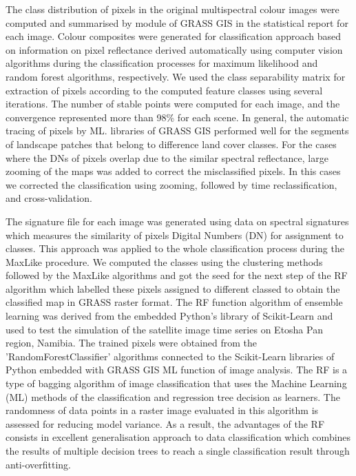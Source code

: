 \documentclass[climate,article,submit,pdftex,moreauthors]{Definitions/mdpi}
\begin{document}
The class distribution of pixels in the original multispectral colour images were computed and summarised by module of GRASS GIS in the statistical report for each image. Colour composites were generated for classification approach based on information on pixel reflectance derived automatically using computer vision algorithms during the classification processes for maximum likelihood and random forest algorithms, respectively. We used the class separability matrix for extraction of pixels according to the computed feature classes using several iterations. The number of stable points were computed for each image, and the convergence represented more than 98\% for each scene. {In general, the automatic tracing of pixels by ML. libraries of GRASS GIS performed well for the segments of landscape patches that belong to difference land cover classes. For the cases where the DNs of pixels overlap due to the similar spectral reflectance, large zooming of the maps was added to correct the misclassified pixels. In this cases we corrected the classification using zooming, followed by time reclassification, and cross-validation.
}

{The signature} file for each image was generated using data on spectral signatures which measures the similarity  of pixels Digital Numbers (DN) for assignment to classes. This approach was applied to the whole classification process during the MaxLike procedure. We computed the classes using the clustering methods followed by the MaxLike algorithms and got the seed for the next step of {the RF} algorithm which labelled these pixels assigned to different classed to obtain the classified map in GRASS raster format. {The RF} function algorithm of ensemble learning was derived from the embedded Python's library of Scikit-Learn and used to test the simulation of the satellite image time series on Etosha Pan region, Namibia. The trained pixels were obtained from the 'RandomForestClassifier' algorithms connected to the Scikit-Learn libraries of Python \cite{Pedregosa} embedded with GRASS GIS ML function of image analysis. The RF is a type of bagging algorithm of image classification that uses the Machine Learning (ML) methods of the classification and regression tree decision as learners. The randomness of data points in a raster image evaluated in this algorithm is assessed for reducing model variance. As a result, the advantages of the RF consists in excellent generalisation approach to data classification which combines the results of multiple decision trees to reach a single classification result through anti-overfitting. 
\end{document}
